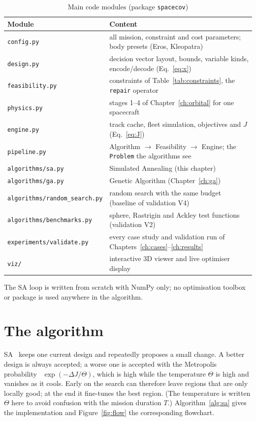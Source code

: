 \begin{table}[htbp]
\centering
\caption{Main code modules (package \texttt{spacecov})}
\label{tab:modules}
\footnotesize
\begin{tabularx}{\textwidth}{@{}p{5.6cm}X@{}}
\toprule
Module & Content \\
\midrule
\texttt{config.py} & all mission, constraint and cost parameters; body presets (Eros, Kleopatra) \\
\texttt{design.py} & decision vector layout, bounds, variable kinds, encode/decode (Eq.~\ref{eq:x}) \\
\texttt{feasibility.py} & constraints of Table~\ref{tab:constraints}, the \texttt{repair} operator \\
\texttt{physics.py} & stages 1--4 of Chapter~\ref{ch:orbital} for one spacecraft \\
\texttt{engine.py} & track cache, fleet simulation, objectives and $J$ (Eq.~\ref{eq:J}) \\
\texttt{pipeline.py} & Algorithm $\rightarrow$ Feasibility $\rightarrow$ Engine; the \texttt{Problem} the algorithms see \\
\texttt{algorithms/sa.py} & Simulated Annealing (this chapter) \\
\texttt{algorithms/ga.py} & Genetic Algorithm (Chapter~\ref{ch:ga}) \\
\texttt{algorithms/random\_search.py} & random search with the same budget (baseline of validation V4) \\
\texttt{algorithms/benchmarks.py} & sphere, Rastrigin and Ackley test functions (validation V2) \\
\texttt{experiments/validate.py} & every case study and validation run of Chapters~\ref{ch:cases}--\ref{ch:results} \\
\texttt{viz/} & interactive 3D viewer and live optimiser display \\
\bottomrule
\end{tabularx}
\end{table}

The \ac{SA} loop is written from scratch with NumPy only; no optimisation toolbox or package is
used anywhere in the algorithm.

\section{The algorithm}
\ac{SA}~\cite{kirkpatrick1983} keeps one current design and repeatedly proposes a small change.
A better design is always accepted; a worse one is accepted with the Metropolis
probability~\cite{metropolis1953} $\exp(-\Delta J/\Theta)$, which is high while the temperature
$\Theta$ is high and vanishes as it cools. Early on the search can therefore leave regions that
are only locally good; at the end it fine-tunes the best region. (The temperature is written
$\Theta$ here to avoid confusion with the mission duration $T$.) Algorithm~\ref{alg:sa} gives the
implementation and Figure~\ref{fig:flow} the corresponding flowchart.

